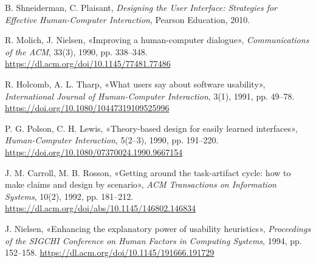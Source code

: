 \begin{enumerate}[label={[\arabic*]}, leftmargin=2.2em, itemsep=2pt]
  \item B. Shneiderman, C. Plaisant, \textit{Designing the User Interface: Strategies for Effective
    Human-Computer Interaction}, Pearson Education, 2010.
  \item R. Molich, J. Nielsen, «Improving a human-computer dialogue», \textit{Communications of the ACM},
    33(3), 1990, pp. 338--348. \url{https://dl.acm.org/doi/10.1145/77481.77486}
  \item R. Holcomb, A. L. Tharp, «What users say about software usability», \textit{International
    Journal of Human-Computer Interaction}, 3(1), 1991, pp. 49--78. \url{https://doi.org/10.1080/10447319109525996}
  \item P. G. Polson, C. H. Lewis, «Theory-based design for easily learned interfaces»,
    \textit{Human-Computer Interaction}, 5(2--3), 1990, pp. 191--220. \url{https://doi.org/10.1080/07370024.1990.9667154}
  \item J. M. Carroll, M. B. Rosson, «Getting around the task-artifact cycle: how to make claims and
    design by scenario», \textit{ACM Transactions on Information Systems}, 10(2), 1992, pp. 181--212.
    \url{https://dl.acm.org/doi/abs/10.1145/146802.146834}
  \item J. Nielsen, «Enhancing the explanatory power of usability heuristics», \textit{Proceedings of
    the SIGCHI Conference on Human Factors in Computing Systems}, 1994, pp. 152--158.
    \url{https://dl.acm.org/doi/10.1145/191666.191729}
\end{enumerate}

